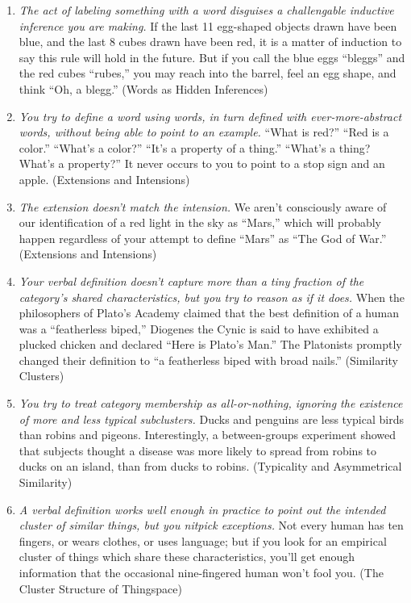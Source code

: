 {\begin{enumerate}
\item {
 \textit{The act of labeling something with a word disguises a
challengable inductive inference you are making.} If the last 11
egg-shaped objects drawn have been blue, and the last 8 cubes drawn
have been red, it is a matter of induction to say this rule will hold
in the future. But if you call the blue eggs
``bleggs'' and the red cubes
``rubes,'' you may reach into the
barrel, feel an egg shape, and think ``Oh, a
blegg.'' (Words as Hidden Inferences)}

\item {
 \textit{You try to define a word using words, in turn defined with
ever-more-abstract words, without being able to point to an example.}
``What is red?''
``Red is a color.''
``What's a color?''
``It's a property of a
thing.'' ``What's a
thing? What's a property?'' It never
occurs to you to point to a stop sign and an apple. (Extensions and
Intensions)}

\item {
 \textit{The extension doesn't match the
intension.} We aren't consciously aware of our
identification of a red light in the sky as
``Mars,'' which will probably happen
regardless of your attempt to define
``Mars'' as ``The
God of War.'' (Extensions and Intensions)}

\item {
 \textit{Your verbal definition doesn't capture
more than a tiny fraction of the category's shared
characteristics, but you try to reason as if it does.} When the
philosophers of Plato's Academy claimed that the best
definition of a human was a ``featherless
biped,'' Diogenes the Cynic is said to have exhibited
a plucked chicken and declared ``Here is
Plato's Man.'' The Platonists
promptly changed their definition to ``a featherless
biped with broad nails.'' (Similarity Clusters)}

\item {
 \textit{You try to treat category membership as all-or-nothing,
ignoring the existence of more and less typical subclusters.} Ducks and
penguins are less typical birds than robins and pigeons. Interestingly,
a between-groups experiment showed that subjects thought a disease was
more likely to spread from robins to ducks on an island, than from
ducks to robins. (Typicality and Asymmetrical Similarity)}

\item {
 \textit{A verbal definition works well enough in practice to point
out the intended cluster of similar things, but you nitpick
exceptions.} Not every human has ten fingers, or wears clothes, or uses
language; but if you look for an empirical cluster of things which
share these characteristics, you'll get enough
information that the occasional nine-fingered human
won't fool you. (The Cluster Structure of Thingspace)}


\end{enumerate}}
